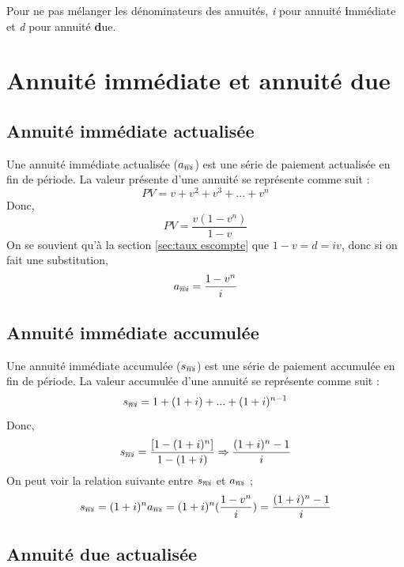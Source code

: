 \documentclass[11pt,french]{report}
\makeatletter
\DeclareRobustCommand{\annuity}[1]{%
\def\arraystretch{0}%
\setlength\arraycolsep{.7pt}%
\setlength\arrayrulewidth{.3pt}%
\begin{array}[b]{@{}c|}\hline
\\[\arraycolsep]%
\scriptstyle #1%
\end{array}%
}
\makeatother
\begin{document}
Pour ne pas mélanger les dénominateurs des annuités, \textit{i} pour annuité {\large \textbf{i}}mmédiate et {\large \textit{d}} pour annuité \textbf{d}ue.

\section{Annuité immédiate et annuité due}
\label{sec:annuité immédiate et due}

\subsection{Annuité immédiate actualisée}


Une annuité immédiate actualisée ($a_{\annuity{n}i}$) est une série de paiement actualisée en fin de période. La valeur présente d'une annuité se représente comme suit :
\begin{equation}
PV = v + v^2 + v^3 + ... + v^n
\end{equation}
Donc,
\begin{equation}
PV = \frac{v(1 - v^n)}{1 - v}
\end{equation}
On se souvient qu'à la section \ref{sec:taux escompte} que $ 1 - v = d = iv $, donc si on fait une substitution,
\begin{equation}
a_{\annuity{n}i} = \frac{1 - v^n}{i}
\end{equation}

\subsection{Annuité immédiate accumulée}


Une annuité immédiate accumulée ($s_{\annuity{n}i}$) est une série de paiement accumulée en fin de période. La valeur accumulée d'une annuité se représente comme suit :
\begin{equation}
s_{\annuity{n}i} = 1 + (1 +i) + ... + (1+i)^{n-1}
\end{equation}
Donc,
\begin{equation}
s_{\annuity{n}i} = \frac{[1 - (1+i)^n]}{1-(1+i)} \Rightarrow \frac{(1+i)^n - 1}{i}
\end{equation}
On peut voir la relation suivante entre $s_{\annuity{n}i}$ et $a_{\annuity{n}i}$ ;
\begin{equation}
s_{\annuity{n}i} = (1 + i)^n a_{\annuity{n}i} = (1 + i)^n (\frac{1-v^n}{i}) = \frac{(1+i)^n - 1}{i}
\end{equation}

\subsection{Annuité due actualisée}
\end{document}
